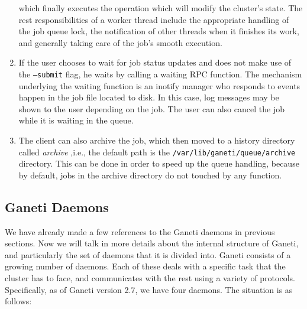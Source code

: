 \begin{enumerate}
        which finally executes the operation which will modify the
        cluster's state. The rest responsibilities of a worker thread include
        the appropriate handling of the job queue lock, the notification of
        other threads when it finishes its work, and generally taking care of
        the job's smooth execution.
  \item If the user chooses to wait for job status updates and does not make
        use of the \texttt{--submit} flag, he waits by calling a waiting RPC
        function. The mechanism underlying the waiting function is an
        inotify manager who responds to events happen in the job file
        located to disk. In this case, log messages may be shown to the user
        depending on the job. The user can also cancel the job while it is
        waiting in the queue.
  \item The client can also archive the job, which then moved to a history
        directory called \emph{archive} ,i.e., the default path is the
        \texttt{/var/lib/ganeti/queue/archive} directory. This can be done in
        order to speed up the queue handling, because by default, jobs in the
        archive directory do not touched by any function.
\end{enumerate}

\subsection{Ganeti Daemons}\label{subsec:daemons}

We have already made a few references to the Ganeti daemons in previous
sections. Now we will talk in more details about the internal structure of
Ganeti, and particularly the set of daemons that it is divided into. Ganeti
consists of a growing number of daemons. Each of these deals with a specific
task that the cluster has to face, and communicates with the rest using a
variety of protocols. Specifically, as of Ganeti version 2.7, we have four
daemons. The situation is as follows:


